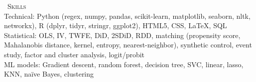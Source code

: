 \documentclass[a4paper,11pt]{article}
\newcommand{\header} [1] {
    \vspace{1mm}
    {\textsc{\large{\xrfill[0.5ex]{0.5pt}~#1~\xrfill[0.5ex]{0.5pt}}}} %
}
\begin{document}

\header{Skills} \\
\vspace{1mm}
Technical: Python (regex, numpy, pandas, scikit-learn, matplotlib, seaborn, nltk, networkx), R (dplyr, tidyr, stringr, ggplot2), HTML5, CSS, \LaTeX, SQL \\

Statistical: OLS, IV, TWFE, DiD, 2SDiD, RDD, matching (propensity score, Mahalanobis distance, kernel, entropy, nearest-neighbor), synthetic control, event study, factor and cluster analysis, logit/probit \\

ML models: Gradient descent, random forest, decision tree, SVC, linear, lasso, KNN, na\"{i}ve Bayes, clustering
\end{document}
